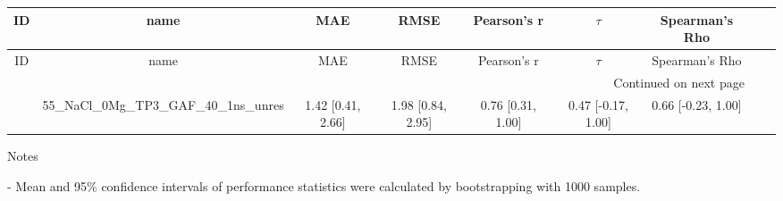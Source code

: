 \documentclass{article}
\begin{document}
\begin{center}
\scriptsize
\begin{longtable}{|ccccccccc|}
\toprule
ID & name & MAE & RMSE & Pearson's r & $\tau$ & Spearman's Rho \\
\midrule
\endfirsthead
\toprule
ID & name & MAE & RMSE & Pearson's r & $\tau$ & Spearman's Rho \\
\midrule
\endhead
\midrule
\multicolumn{7}{r}{Continued on next page} \\
\midrule
\endfoot
\bottomrule
\endlastfoot
1 & 55\_NaCl\_0Mg\_TP3\_GAF\_40\_1ns\_unres & 1.42 [0.41, 2.66] & 1.98 [0.84, 2.95] & 0.76 [0.31, 1.00] & 0.47 [-0.17, 1.00] & 0.66 [-0.23, 1.00] \\
\end{longtable}
\end{center}

Notes

- Mean and 95\% confidence intervals of performance statistics were calculated by bootstrapping with 1000 samples.
\end{document}
